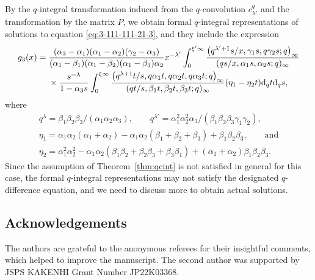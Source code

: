 \documentclass[pdftex]{sigma}
\numberwithin{equation}{section}
\theoremstyle{definition}
\begin{document}
By the $q$-integral transformation induced from the $q$-convolution $c_{\lambda'}^q$ and the transformation by the matrix $P$, we obtain formal $q$-integral representations of solutions to equation \eqref{eq:3-111-111-21-3}, and they include the expression
\begin{align*}
g_3(x) ={}& \frac{(\alpha_3 - \alpha_1)(\alpha_1 - \alpha_2)(\gamma_2 - \alpha_3)}{(\alpha_1 - \beta_1)(\alpha_1 - \beta_2)(\alpha_1 - \beta_3)\alpha_2} x^{-\lambda'} \int_0^{\xi' \infty} \frac{\bigl(q^{\lambda'+1}s/x, \gamma_1 s, q\gamma_2 s; q\bigr)_{\infty}}{(qs/x, \alpha_1 s, \alpha_2 s; q)_{\infty}} \\
& \times \frac{s^{-\lambda}}{1 - \alpha_3 s} \int_0^{\xi \infty} \frac{\bigl(q^{\lambda+1}t/s, q\alpha_1 t, q\alpha_2 t, q\alpha_3 t; q\bigr)_{\infty}}{(qt/s, \beta_1 t, \beta_2 t, \beta_3 t; q)_{\infty}} (\eta_1 - \eta_2 t) {\rm d}_q t {\rm d}_q s,
\end{align*}
where
\begin{gather*}
q^{\lambda} = \beta_1\beta_2\beta_3/(\alpha_1\alpha_2\alpha_3),\qquad q^{\lambda'} = \alpha_1^2\alpha_2^2\alpha_3/(\beta_1\beta_2\beta_3\gamma_1\gamma_2), \\ \eta_1 = \alpha_1\alpha_2(\alpha_1 + \alpha_2) - \alpha_1\alpha_2(\beta_1 + \beta_2 + \beta_3) + \beta_1\beta_2\beta_3,\qquad \text{and}\\
\eta_2 = \alpha_1^2\alpha_2^2 - \alpha_1\alpha_2(\beta_1\beta_2 + \beta_2\beta_3 + \beta_3\beta_1) + (\alpha_1 + \alpha_2)\beta_1\beta_2\beta_3.
\end{gather*}
Since the assumption of Theorem~\ref{thm:qcint} is not satisfied in general for this case, the formal $q$\nobreakdash-integral representations may not satisfy the designated $q$-difference equation, and we need to discuss more to obtain actual solutions.

\subsection*{Acknowledgements}
The authors are grateful to the anonymous referees for their insightful comments, which helped to improve the manuscript.
The second author was supported by JSPS KAKENHI Grant Number JP22K03368.
\end{document}
